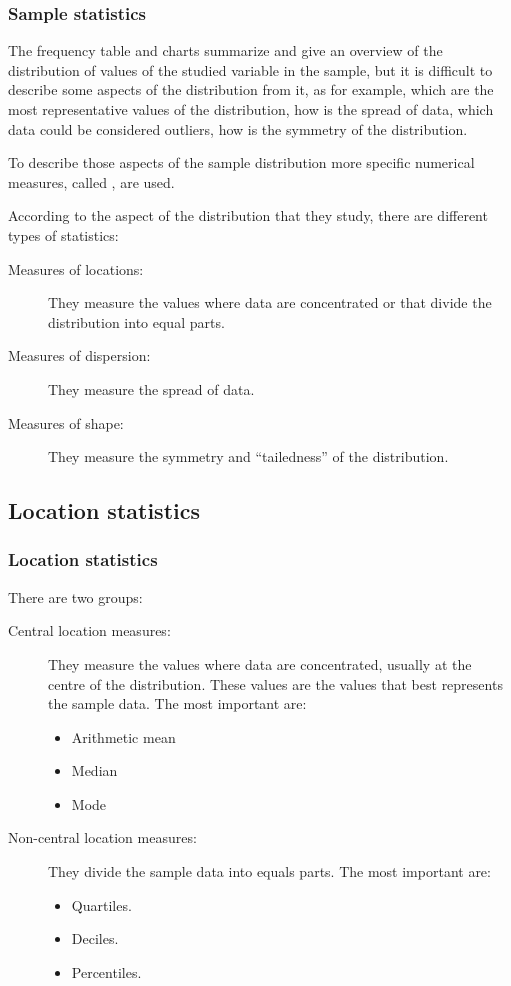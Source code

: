 \begin{frame}
\frametitle{Sample statistics}
The frequency table and charts summarize and give an overview of the distribution of values of the studied variable in the sample, but it is difficult to describe some aspects of the distribution from it, as for example, which are the most representative values of the distribution, how is the spread of data, which data could be considered outliers, how is the symmetry of the distribution. 

To describe those aspects of the sample distribution more specific numerical measures, called
, are used.

According to the aspect of the distribution that they study, there are different types of statistics:
\begin{description}
\item[Measures of locations:] They measure the values where data are concentrated or that divide the distribution into
equal parts. 
\item[Measures of dispersion:] They measure the spread of data.
\item[Measures of shape:] They measure the symmetry and ``tailedness'' of the distribution.  
\end{description}
\end{frame}


\subsection{Location statistics}

\begin{frame}
\frametitle{Location statistics}
There are two groups: 

\begin{description}
\item [Central location measures:] They measure the values where data are concentrated, usually at the
centre of the distribution. 
These values are the values that best represents the sample data. 
The most important are:
\begin{itemize}
\item Arithmetic mean
\item Median
\item Mode
\end{itemize}
\item [Non-central location measures:] They divide the sample data into equals parts. 
The most important are:
\begin{itemize}
\item Quartiles.
\item Deciles.
\item Percentiles. 
\end{itemize}
\end{description}
\end{frame}


